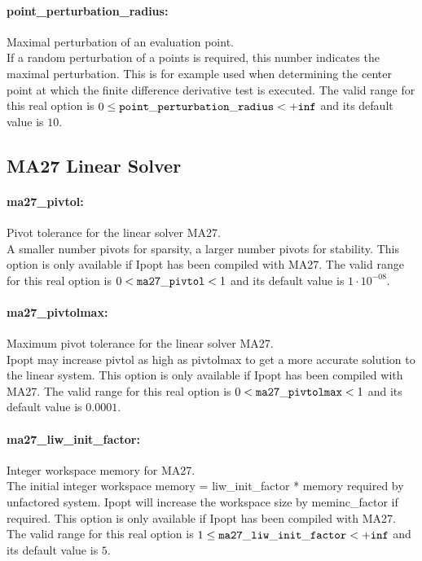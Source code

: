 \paragraph{point\_perturbation\_radius:}\label{opt:point_perturbation_radius} Maximal perturbation of an evaluation point. \\
 If a random perturbation of a points is required, this number indicates the maximal perturbation.  This is for example used when determining the center point at which the finite difference derivative test is executed. The valid range for this real option is 
$0 \le {\tt point\_perturbation\_radius } <  {\tt +inf}$
and its default value is $10$.


\subsection{MA27 Linear Solver}

\paragraph{ma27\_pivtol:}\label{opt:ma27_pivtol} Pivot tolerance for the linear solver MA27. \\
 A smaller number pivots for sparsity, a larger number pivots for stability.  This option is only available if Ipopt has been compiled with MA27. The valid range for this real option is 
$0 <  {\tt ma27\_pivtol } <  1$
and its default value is $1 \cdot 10^{-08}$.


\paragraph{ma27\_pivtolmax:}\label{opt:ma27_pivtolmax} Maximum pivot tolerance for the linear solver MA27. \\
 Ipopt may increase pivtol as high as pivtolmax to get a more accurate solution to the linear system.  This option is only available if Ipopt has been compiled with MA27. The valid range for this real option is 
$0 <  {\tt ma27\_pivtolmax } <  1$
and its default value is $0.0001$.


\paragraph{ma27\_liw\_init\_factor:}\label{opt:ma27_liw_init_factor} Integer workspace memory for MA27. \\
 The initial integer workspace memory = liw\_init\_factor * memory required by unfactored system. Ipopt will increase the workspace size by meminc\_factor if required.  This option is only available if Ipopt has been compiled with MA27. The valid range for this real option is 
$1 \le {\tt ma27\_liw\_init\_factor } <  {\tt +inf}$
and its default value is $5$.


